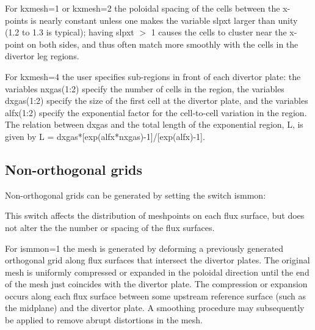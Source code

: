 \documentclass [12pt]{article}
\def\hsa{\hskip.4truein}
\begin{document}
For kxmesh=1 or kxmesh=2 the poloidal spacing of the cells between the
x-points is nearly constant unless one makes the variable slpxt larger
than unity (1.2 to 1.3 is typical); having slpxt $>$ 1 causes the cells
to cluster near the x-point on both sides, and thus often match more
smoothly with the cells in the divertor leg regions.

For kxmesh=4 the user specifies sub-regions in front of each
divertor plate: the variables nxgas(1:2) specify the number of cells
in the region, the variables dxgas(1:2) specify the size of the first
cell at the divertor plate, and the variables alfx(1:2) specify the
exponential factor for the cell-to-cell variation in the region.  The
relation between dxgas and the total length of the exponential region, L,
is given by L = dxgas*[exp(alfx*nxgas)-1]/[exp(alfx)-1].

\subsection{Non-orthogonal grids}

Non-orthogonal grids can be generated by setting the switch {\sf ismmon}:
{\sf
{}
}
This switch affects the distribution of meshpoints on each flux surface,
but does not alter the the number or spacing of the flux surfaces.

For ismmon=1 the mesh is generated by deforming a previously generated
orthogonal grid along flux surfaces that intersect the divertor
plates.  The original mesh is uniformly compressed or expanded in the
poloidal direction until the end of the mesh just coincides with the
divertor plate.  The compression or expansion occurs along each flux
surface between some upstream reference surface (such as the midplane)
and the divertor plate.  A smoothing procedure may subsequently be applied
to remove abrupt distortions in the mesh.
\end{document}
